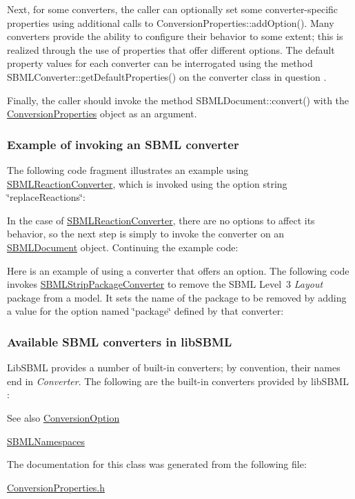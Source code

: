 Next, for some converters, the caller can optionally set some converter-\/specific properties using additional calls to Conversion\+Properties\+::add\+Option(). Many converters provide the ability to configure their behavior to some extent; this is realized through the use of properties that offer different options. The default property values for each converter can be interrogated using the method S\+B\+M\+L\+Converter\+::get\+Default\+Properties() on the converter class in question .

Finally, the caller should invoke the method S\+B\+M\+L\+Document\+::convert() with the \hyperlink{class_conversion_properties}{Conversion\+Properties} object as an argument.\hypertarget{classdoc__section__using__sbml__converters_converter-example}{}\subsubsection{Example of invoking an S\+B\+M\+L converter}\label{classdoc__section__using__sbml__converters_converter-example}
The following code fragment illustrates an example using \hyperlink{class_s_b_m_l_reaction_converter}{S\+B\+M\+L\+Reaction\+Converter}, which is invoked using the option string {\ttfamily \char`\"{}replace\+Reactions\char`\"{}}\+:

In the case of \hyperlink{class_s_b_m_l_reaction_converter}{S\+B\+M\+L\+Reaction\+Converter}, there are no options to affect its behavior, so the next step is simply to invoke the converter on an \hyperlink{class_s_b_m_l_document}{S\+B\+M\+L\+Document} object. Continuing the example code\+:

Here is an example of using a converter that offers an option. The following code invokes \hyperlink{class_s_b_m_l_strip_package_converter}{S\+B\+M\+L\+Strip\+Package\+Converter} to remove the S\+B\+ML Level~3 {\itshape Layout} package from a model. It sets the name of the package to be removed by adding a value for the option named {\ttfamily \char`\"{}package\char`\"{}} defined by that converter\+:\hypertarget{classdoc__section__using__sbml__converters_available-converters}{}\subsubsection{Available S\+B\+M\+L converters in lib\+S\+B\+ML}\label{classdoc__section__using__sbml__converters_available-converters}
Lib\+S\+B\+ML provides a number of built-\/in converters; by convention, their names end in {\itshape Converter}. The following are the built-\/in converters provided by lib\+S\+B\+ML \+:

\begin{DoxySeeAlso}{See also}
\hyperlink{class_conversion_option}{Conversion\+Option} 

\hyperlink{class_s_b_m_l_namespaces}{S\+B\+M\+L\+Namespaces} 
\end{DoxySeeAlso}


The documentation for this class was generated from the following file\+:\begin{DoxyCompactItemize}
\item 
\hyperlink{_conversion_properties_8h}{Conversion\+Properties.\+h}\end{DoxyCompactItemize}
